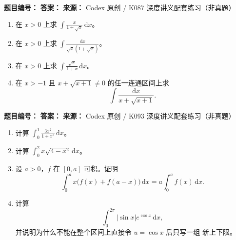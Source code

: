 \begin{problemBox}
\begin{problemMeta}
\textbf{题目编号：} \quad
\textbf{答案：} \quad
\textbf{来源：} Codex 原创 / K087 深度讲义配套练习（非真题）
\end{problemMeta}
\begin{enumerate}
  \item[\textbf{A}] 在 \(x>0\) 上求
  \(\displaystyle\int\frac{x}{1+\sqrt x}\,\mathrm dx\)。
  \item[\textbf{B}] 在 \(x>0\) 上求
  \(\displaystyle\int\frac{\mathrm dx}{\sqrt x(1+\sqrt x)}\)。
  \item[\textbf{C}] 在 \(x>0\) 上求
  \(\displaystyle\int\frac{\sqrt x}{1+x}\,\mathrm dx\)。
  \item[\textbf{M}] 在 \(x>-1\) 且
  \(x+\sqrt{x+1}\ne0\) 的任一连通区间上求
  \[
  \int\frac{\mathrm dx}{x+\sqrt{x+1}}.
  \]
\end{enumerate}
\end{problemBox}

\begin{problemBox}
\begin{problemMeta}
\textbf{题目编号：} \quad
\textbf{答案：} \quad
\textbf{来源：} Codex 原创 / K093 深度讲义配套练习（非真题）
\end{problemMeta}
\begin{enumerate}
  \item[\textbf{A}] 计算
  \(\displaystyle\int_0^1\frac{3x^2}{1+x^3}\,\mathrm dx\)。
  \item[\textbf{B}] 计算
  \(\displaystyle\int_0^2x\sqrt{4-x^2}\,\mathrm dx\)。
  \item[\textbf{C}] 设 \(a>0\)，\(f\) 在 \([0,a]\) 可积。证明
  \[
  \int_0^a x\bigl(f(x)+f(a-x)\bigr)\,\mathrm dx
  =a\int_0^a f(x)\,\mathrm dx.
  \]
  \item[\textbf{M}] 计算
  \[
  \int_0^{2\pi}|\sin x|e^{\cos x}\,\mathrm dx,
  \]
  并说明为什么不能在整个区间上直接令 \(u=\cos x\) 后只写一组
  新上下限。
\end{enumerate}
\end{problemBox}

